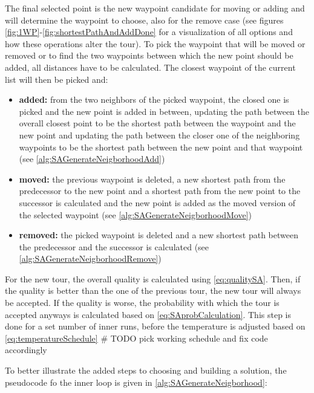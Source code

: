 The final selected point is the new waypoint candidate for moving or adding and will determine the waypoint to choose, also for the remove case (see figures \ref{fig:1WP}-\ref{fig:shortestPathAndAddDone} for a visualization of all options and how these operations alter the tour).
To pick the waypoint that will be moved or removed or to find the two waypoints between which the new point should be added, all distances have to be calculated.
The closest waypoint of the current list will then be picked and:

\begin{itemize}
	\item \textbf{added:} from the two neighbors of the picked waypoint, the closed one is picked and the new point is added in between, updating the path between the overall closest point to be the shortest path between the waypoint and the new point and updating the path between the closer one of the neighboring waypoints to be the shortest path between the new point and that waypoint (see \ref{alg:SAGenerateNeigborhoodAdd})
	\item \textbf{moved:} the previous waypoint is deleted, a new shortest path from the predecessor to the new point and a shortest path from the new point to the successor is calculated and the new point is added as the moved version of the selected waypoint (see \ref{alg:SAGenerateNeigborhoodMove})
	\item \textbf{removed:} the picked waypoint is deleted and a new shortest path between the predecessor and the successor is calculated (see \ref{alg:SAGenerateNeigborhoodRemove})
\end{itemize}

For the new tour, the overall quality is calculated using \ref{eq:qualitySA}. 
Then, if the quality is better than the one of the previous tour, the new tour will always be accepted.
If the quality is worse, the probability with which the tour is accepted anyways is calculated based on \ref{eq:SAprobCalculation}. 
This step is done for a set number of inner runs, before the temperature is adjusted based on \ref{eq:temperatureSchedule} \# TODO pick working schedule and fix code accordingly

To better illustrate the added steps to choosing and building a solution, the pseudocode fo the inner loop is given in \ref{alg:SAGenerateNeigborhood}:



